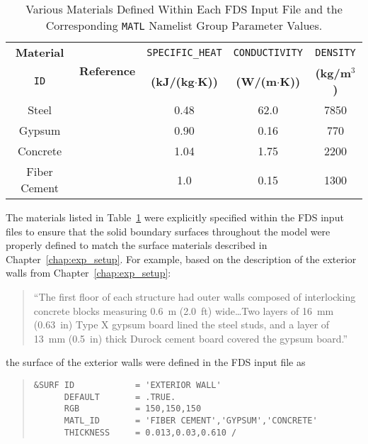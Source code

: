 \begin{table}[!ht]
\cprotect\caption{Various Materials Defined Within Each FDS Input File and the Corresponding \verb|MATL| Namelist Group Parameter Values.}
\begin{center}
\begin{tabular}{ccccc}
\toprule
\textbf{Material}  &  \multirow{2}{*}{\textbf{Reference}} & \verb|SPECIFIC_HEAT|	        &  \verb|CONDUCTIVITY| 	      & \verb|DENSITY| 	\\
\verb|ID|		       &                                      &   \textbf{(kJ/(kg$\cdot$K))} 	& 	\textbf{(W/(m$\cdot$K))} 	&  \textbf{(kg/m$^3$)} 		\\
\midrule
Steel 			       & 	     \cite{Gross:Props}             &	        0.48   		            &  		 62.0	 		              & 	 7850  			\\
Gypsum 			       & 	     \cite{Gross:Props}             &	        0.90                  &  		 0.16	 		              & 	  770  			\\
Concrete 		       & 	     \cite{Gross:Props}             &	        1.04   		            &  		 1.75	 		              & 	 2200  			\\
Fiber Cement 	     &       \cite{Durock:specs}            &		      1.0     		          &  		 0.15	 		              & 	 1300  			\\
\bottomrule
\end{tabular}
\end{center}
\label{table:material_props}
\end{table}
\FloatBarrier

The materials listed in Table~\ref{table:material_props} were explicitly specified within the FDS input files to ensure that the solid boundary surfaces throughout the model were properly defined to match the surface materials described in Chapter~\ref{chap:exp_setup}. For example, based on the description of the exterior walls from Chapter~\ref{chap:exp_setup}:  
\begin{quote}
``The first floor of each structure had outer walls composed of interlocking concrete blocks measuring 0.6~m (2.0~ft) wide\ldots Two layers of 16~mm (0.63~in) Type X gypsum board lined the steel studs, and a layer of 13~mm (0.5~in) thick Durock cement board covered the gypsum board.''
\end{quote}
the surface of the exterior walls were defined in the FDS input file as 
\begin{quote}
\begin{verbatim}
&SURF ID            = 'EXTERIOR WALL'
      DEFAULT       = .TRUE.
      RGB           = 150,150,150
      MATL_ID       = 'FIBER CEMENT','GYPSUM','CONCRETE'
      THICKNESS     = 0.013,0.03,0.610 /
\end{verbatim}
\end{quote}

